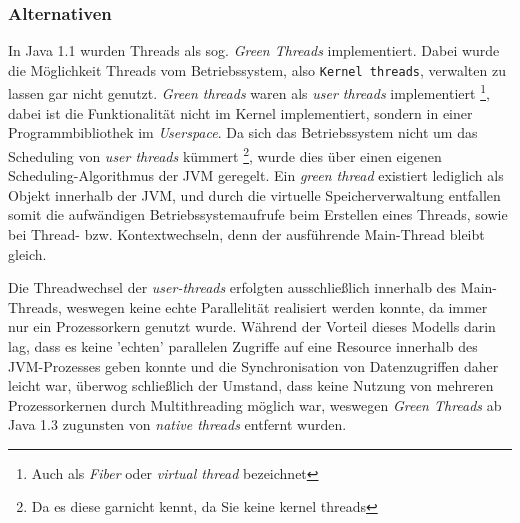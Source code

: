 \subsubsection{Alternativen}
\label{section:alternativen}
In Java 1.1 wurden Threads als sog. \textit{Green Threads} implementiert. Dabei wurde die Möglichkeit Threads vom Betriebssystem, also \verb|Kernel threads|,
verwalten zu lassen gar nicht genutzt.
\textit{Green threads} waren als \textit{user threads} implementiert \footnote{Auch als \textit{Fiber} oder \textit{virtual thread} bezeichnet},
dabei ist die Funktionalität
nicht im Kernel implementiert, sondern in einer Programmbibliothek im \textit{Userspace}.
Da sich das Betriebssystem nicht um das Scheduling von \textit{user threads} kümmert
\footnote{Da es diese garnicht kennt, da Sie keine kernel threads}, wurde dies über einen eigenen Scheduling-Algorithmus der JVM
geregelt.\parencite{Oracle2010}
Ein \textit{green thread} existiert lediglich als Objekt innerhalb der JVM, und durch die virtuelle Speicherverwaltung entfallen somit
die aufwändigen Betriebssystemaufrufe beim
Erstellen eines Threads, sowie bei Thread- bzw. Kontextwechseln, denn der ausführende Main-Thread bleibt gleich.

Die Threadwechsel der \textit{user-threads} erfolgten ausschließlich innerhalb des Main-Threads, weswegen keine echte Parallelität realisiert werden konnte,
da immer nur ein Prozessorkern genutzt wurde.
Während der Vorteil dieses Modells darin lag, dass es keine 'echten' parallelen Zugriffe auf eine Resource innerhalb des JVM-Prozesses geben konnte
und die Synchronisation von Datenzugriffen daher leicht war, überwog schließlich der Umstand, dass keine Nutzung von mehreren Prozessorkernen
durch Multithreading möglich war, weswegen \textit{Green Threads} ab Java 1.3 zugunsten von \textit{native threads} entfernt wurden.

